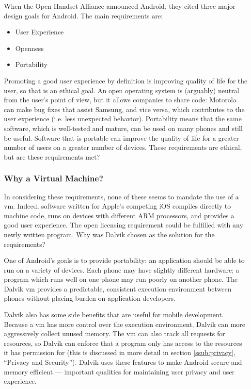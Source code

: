 \documentclass[11pt]{article}
\begin{document}
\begin{multicols}{2}
When the Open Handset Alliance announced Android, they cited three major
design goals for Android.  The main requirements are: \cite{open-handset-alliance-ann}

\begin{itemize}
    \item User Experience
    \item Openness
    \item Portability
\end{itemize}

Promoting a good user experience by definition is improving quality of life for
the user, so that is an ethical goal.  An open operating system is (arguably)
neutral from the user's point of view, but it allows companies to share code:
Motorola can make bug fixes that assist Samsung, and vice versa, which
contributes to the user experience (i.e. less unexpected behavior).  Portability
means that the same software, which is well-tested and mature, can be used on
many phones and still be useful.  Software that is portable can improve the
quality of life for a greater number of users on a greater number of devices.
These requirements are ethical, but are these requirements met?


\subsubsection{Why a Virtual Machine?} %
\label{ssub:why-vm}

In considering these requirements, none of these seems to mandate the use of a
\gls{vm}.  Indeed, software written for Apple's competing iOS compiles directly
to machine code, runs on devices with different ARM processors, and provides a
good user experience.  The open licensing requirement could be fulfilled with
any newly written program.  Why was Dalvik chosen as the solution for the
requirements?

One of Android's goals is to provide portability: an application should be able
to run on a variety of devices.  Each phone may have slightly different
hardware; a program which runs well on one phone may run poorly on another
phone.  The Dalvik \gls{vm} provides a predictable, consistent execution
environment between phones without placing burden on application developers.

Dalvik also has some side benefits that are useful for mobile development.
Because a \gls{vm} has more control over the execution environment, Dalvik can
more aggressively collect unused memory. \cite{dalvik-vm-arch} The \gls{vm} can
also track all requests for resources, so Dalvik can enforce that a program only
has access to the resources it has permission for (this is discussed in more
detail in section \ref{ssub:privacy}, ``Privacy and Security'').  Dalvik uses
these features to make Android secure and memory efficient --- important
qualities for maintaining user privacy and user experience.


\end{multicols}
\end{document}
